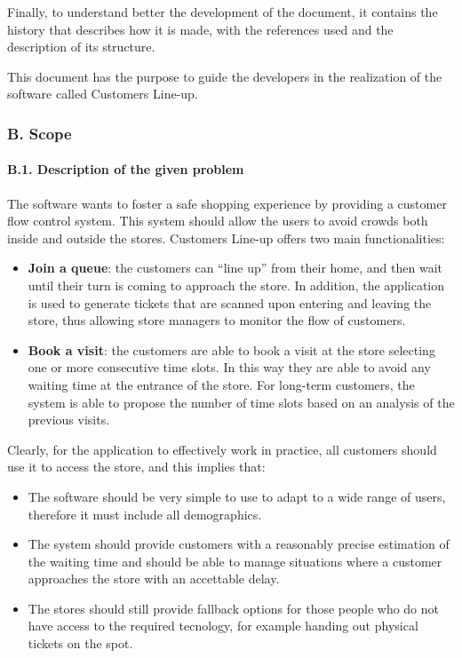 Finally, to understand better the development of the document, it
contains the history that describes how it is made, with the references
used and the description of its structure.

This document has the purpose to guide the developers in the realization
of the software called Customers Line-up.

\hypertarget{b.-scope}{%
\subsubsection{B. Scope}\label{b.-scope}}

\hypertarget{b.1.-description-of-the-given-problem}{%
\paragraph{B.1. Description of the given
problem}\label{b.1.-description-of-the-given-problem}}

The software wants to foster a safe shopping experience by providing a
customer flow control system. This system should allow the users to
avoid crowds both inside and outside the stores. Customers Line-up
offers two main functionalities:

\begin{itemize}
\item
  \textbf{Join a queue}: the customers can ``line up'' from their home,
  and then wait until their turn is coming to approach the store. In
  addition, the application is used to generate tickets that are scanned
  upon entering and leaving the store, thus allowing store managers to
  monitor the flow of customers.
\item
  \textbf{Book a visit}: the customers are able to book a visit at the
  store selecting one or more consecutive time slots. In this way they
  are able to avoid any waiting time at the entrance of the store. For
  long-term customers, the system is able to propose the number of time
  slots based on an analysis of the previous visits.
\end{itemize}

Clearly, for the application to effectively work in practice, all
customers should use it to access the store, and this implies that:

\begin{itemize}
\tightlist
\item
  The software should be very simple to use to adapt to a wide range of
  users, therefore it must include all demographics.
\item
  The system should provide customers with a reasonably precise
  estimation of the waiting time and should be able to manage situations
  where a customer approaches the store with an accettable delay.
\item
  The stores should still provide fallback options for those people who
  do not have access to the required tecnology, for example handing out
  physical tickets on the spot.
\end{itemize}

